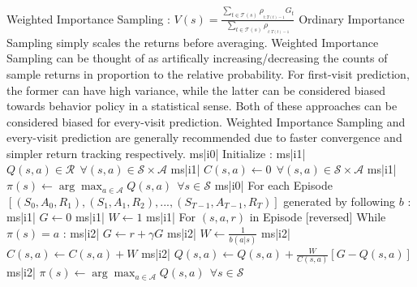 Weighted Importance Sampling : \( V(s) = \frac{\sum_{t \in \mathcal{T}(s)} \rho_{_{t:T(t) - 1}} G_t}{ \sum_{t \in \mathcal{T}(s)} \rho_{_{t:T(t) - 1}} } \)
Ordinary Importance Sampling simply scales the returns before averaging. Weighted Importance Sampling can be thought of as artifically increasing/decreasing the counts of sample returns in proportion to the relative probability. For first-visit prediction, the former can have high variance, while the latter can be considered biased towards behavior policy in a statistical sense. Both of these approaches can be considered biased for every-visit prediction. Weighted Importance Sampling and every-visit prediction are generally recommended due to faster convergence and simpler return tracking respectively.
ms|i0| Initialize :
ms|i1| \( Q(s, a) \in \mathcal{R} \ \ \forall (s,a) \in \mathcal{S} \times \mathcal{A} \)
ms|i1| \( C(s, a) \leftarrow 0 \ \ \forall (s, a) \in \mathcal{S} \times \mathcal{A} \)
ms|i1| \( \pi(s) \leftarrow \arg\max_{a \in \mathcal{A}} Q(s, a) \ \ \forall s \in \mathcal{S} \)
ms|i0| For each Episode \([(S_0, A_0, R_1), (S_1, A_1, R_2),..., (S_{T-1}, A_{T-1}, R_T)] \) generated by following \( b \) :
ms|i1| \( G \leftarrow 0 \)
ms|i1| \( W \leftarrow 1\)
ms|i1| For \( (s,a,r) \) in Episode [reversed] While \( \pi(s) = a \) :
ms|i2| \( G \leftarrow r + \gamma G \)
ms|i2| \( W \leftarrow \frac{1}{b(a | s)} \)
ms|i2| \( C(s, a) \leftarrow C(s, a) + W \)
ms|i2| \( Q(s,a) \leftarrow Q(s, a) + \frac{W}{C(s, a)} [G - Q(s, a)] \)
ms|i2| \( \pi(s) \leftarrow \arg\max_{a \in \mathcal{A}} Q(s, a) \ \ \forall s \in \mathcal{S} \)